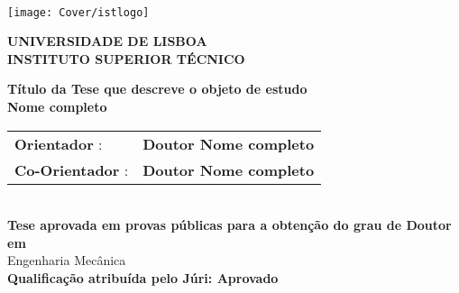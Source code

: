 \setcounter{page}{1} 


\thispagestyle{empty}
\begin{flushleft} ~\\ \vspace{-12mm} \hspace{-12mm}  \texttt{[image: Cover/istlogo]} 
 
\centering
\LARGE \textbf{UNIVERSIDADE DE LISBOA \\ INSTITUTO SUPERIOR TÉCNICO}
\vspace{10mm}

 
\centering
\Large \textbf{Título da Tese que descreve o objeto de estudo}
\\ \vspace{8mm}
\Large \textbf{Nome completo} \\
\vspace{8mm}

\Large
\begin{minipage}{\textwidth}
\begin{tabularx}{\textwidth}{ l @{ } l }
\textbf{Orientador} : & \textbf{Doutor Nome completo}\\
\textbf{Co-Orientador} :  & \textbf{Doutor Nome completo}\\
\end{tabularx}
\end{minipage}
\\ \vspace{8mm}
\centering
\Large \textbf{Tese aprovada em provas públicas para a obtenção do grau de Doutor em}\\
\Large Engenharia Mecânica\\
\vspace{5mm}
\Large \textbf{Qualificação atribuída pelo Júri: Aprovado}
 

\end{flushleft}
